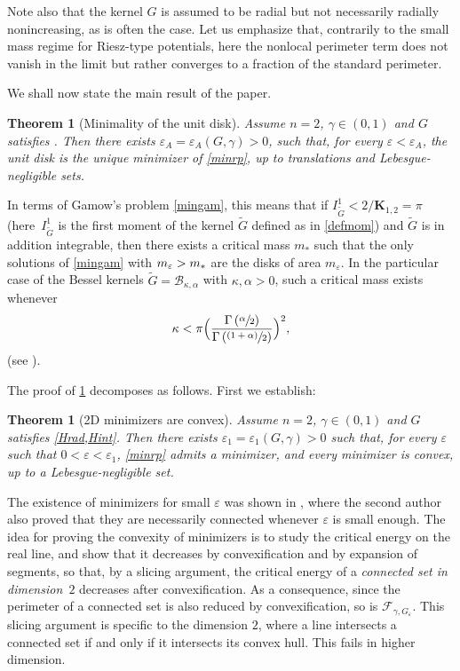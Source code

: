 \documentclass[JEP,XML,SOM,Unicode,published]{cedram}
\newcommand{\psfrac}[2]{\sfrac{(#1)}{#2}}
\numberwithin{equation}{section}
\theoremstyle{plain}
\newtheorem{mainthm}{Theorem}
\newtheorem{mainres}{Theorem}[section]
\theoremstyle{definition}
\newcommand{\bfK}{\boldsymbol{K}}
\newcommand{\calF}{{\mathcal{F}}}
\let\eps\varepsilon
\let\wt\widetilde
\begin{document}
Note also that the kernel $G$ is assumed to be radial but not necessarily radially nonincreasing, as
is often the case.
Let us emphasize that, contrarily to the small mass regime for Riesz-type potentials, here the
nonlocal perimeter term does not vanish in the limit but rather converges to a fraction of the
standard perimeter.

We shall now state the main result of the paper.

\begin{mainres}[Minimality of the unit disk]\label{mainthm:mindisk}
Assume $n=2$, $\gamma\in(0,1)$ and $G$ satisfies . Then there
exists $\eps_A=\eps_A(G,\gamma)>0$, such that, for every $\eps<\eps_A$, the unit disk is the unique
minimizer of \cref{minrp}, up to translations and Lebesgue-negligible sets.
\end{mainres}

In terms of Gamow's problem \cref{mingam}, this means that if
$I_{\wt{G}}^1<2/\bfK_{1,2}=\pi$ (here~$I_{\wt{G}}^1$ is the first moment of the kernel
$\wt{G}$ defined as in \cref{defmom}) and $\wt{G}$ is in addition integrable, then there
exists a critical mass $m_*$ such that the only solutions of \cref{mingam} with $m_\eps>\nobreak m_*$ are the
disks of area $m_\eps$.
In the particular case of the Bessel kernels $\wt{G}=\mathcal{B}_{\kappa,\alpha}$ with
$\kappa,\alpha>0$, such a critical mass exists whenever
\[
\kappa<\pi\Bigl(\frac{\Gamma\left(\sfrac{\alpha}{2}\right)}
{\Gamma\left(\psfrac{1+\alpha}{2}\right)}\Bigr)^2,
\]
(see \cite[Cor.\,3.9 \& Prop.\,3.10]{Peg2021}).

The proof of \cref{mainthm:mindisk} decomposes as follows. First we establish:

\begin{mainthm}[2D minimizers are convex]\label{mainthm:convexmin}
Assume $n=2$, $\gamma\in(0,1)$ and $G$ satisfies \cref{Hrad,Hint}. Then there exists
$\eps_1=\eps_1(G,\gamma)>0$ such that, for every $\eps$ such that $0<\eps<\eps_1$, \cref{minrp} admits a minimizer,
and every minimizer is convex, up to a Lebesgue-negligible set.
\end{mainthm}

The existence of minimizers for small $\eps$ was shown in \cite{Peg2021}, where the second
author also proved that they are necessarily connected whenever $\eps$ is small enough.
The idea for proving the convexity of minimizers is to study the critical energy on the real line,
and show that it decreases by convexification and by expansion of segments, so that, by a slicing
argument, the critical energy of a \emph{connected set in dimension~$2$} decreases after
convexification. As a consequence, since the perimeter of a connected set is also reduced by
convexification, so is $\calF_{\gamma,G_\eps}$. This slicing argument is specific to the dimension
$2$, where a line intersects a connected set if and only if it intersects its convex hull. This
fails in higher dimension.
\end{document}
